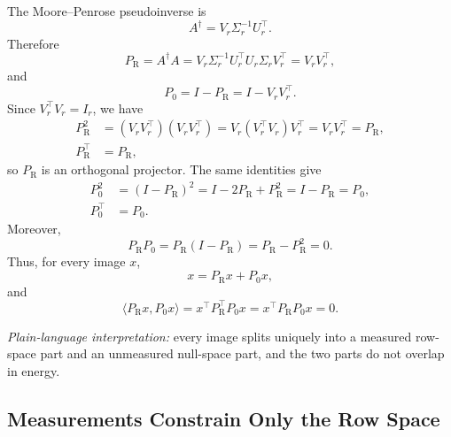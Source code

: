 \documentclass[journal]{IEEEtran}
\newcommand{\pinv}{\dagger}
\newcommand{\PR}{P_{\mathrm{R}}}
\newcommand{\PZ}{P_{0}}
\begin{document}
The Moore--Penrose pseudoinverse is
\begin{equation}
    A^\pinv = V_r \Sigma_r^{-1} U_r^\top.
\end{equation}
Therefore
\begin{equation}
    \PR = A^\pinv A
        = V_r \Sigma_r^{-1} U_r^\top U_r \Sigma_r V_r^\top
        = V_r V_r^\top,
    \label{eq:pr-vv}
\end{equation}
and
\begin{equation}
    \PZ = I-\PR = I-V_rV_r^\top.
    \label{eq:p0-def}
\end{equation}
Since $V_r^\top V_r=I_r$, we have
\begin{align}
    \PR^2 &= (V_rV_r^\top)(V_rV_r^\top)
           =V_r(V_r^\top V_r)V_r^\top
           =V_rV_r^\top=\PR,\\
    \PR^\top &= \PR,
\end{align}
so $\PR$ is an orthogonal projector.  The same identities give
\begin{align}
    \PZ^2 &= (I-\PR)^2=I-2\PR+\PR^2=I-\PR=\PZ,\\
    \PZ^\top &= \PZ.
\end{align}
Moreover,
\begin{equation}
    \PR\PZ=\PR(I-\PR)=\PR-\PR^2=0.
\end{equation}
Thus, for every image $x$,
\begin{equation}
    x = \PR x+\PZ x,
    \label{eq:orth-decomp}
\end{equation}
and
\begin{equation}
    \langle \PR x,\PZ x\rangle
    = x^\top \PR^\top\PZ x
    = x^\top \PR\PZ x
    =0.
    \label{eq:orthogonality}
\end{equation}

\textit{Plain-language interpretation:} every image splits uniquely into a measured row-space part and an unmeasured null-space part, and the two parts do not overlap in energy.

\subsection{Measurements Constrain Only the Row Space}
\end{document}
